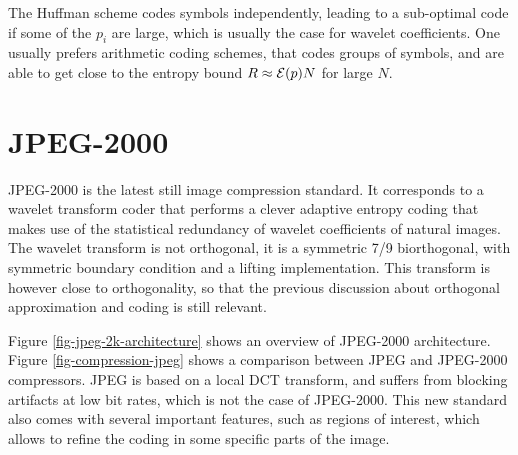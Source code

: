 The Huffman scheme codes symbols independently, leading to a sub-optimal code if some of the $p_i$ are large, which is usually the case for wavelet coefficients. One usually prefers arithmetic coding schemes, that codes groups of symbols, and are able to get close to the entropy bound $R \approx \mathcal{E}(p) N$ for large $N$.




\section{JPEG-2000}

JPEG-2000 is the latest still image compression standard. It corresponds to a wavelet transform coder that performs a clever adaptive entropy coding that makes use of the statistical redundancy of wavelet coefficients of natural images. The wavelet transform is not orthogonal, it is a symmetric 7/9 biorthogonal, with symmetric boundary condition and a lifting implementation. This transform is however close to orthogonality, so that the previous discussion about orthogonal approximation and coding is still relevant.


Figure \ref{fig-jpeg-2k-architecture} shows an overview of JPEG-2000 architecture. Figure \ref{fig-compression-jpeg} shows a comparison between JPEG and JPEG-2000 compressors. JPEG is based on a local DCT transform, and suffers from blocking artifacts at low bit rates, which is not the case of JPEG-2000. This new standard also comes with several important features, such as regions of interest, which allows to refine the coding in some specific parts of the image.
 


